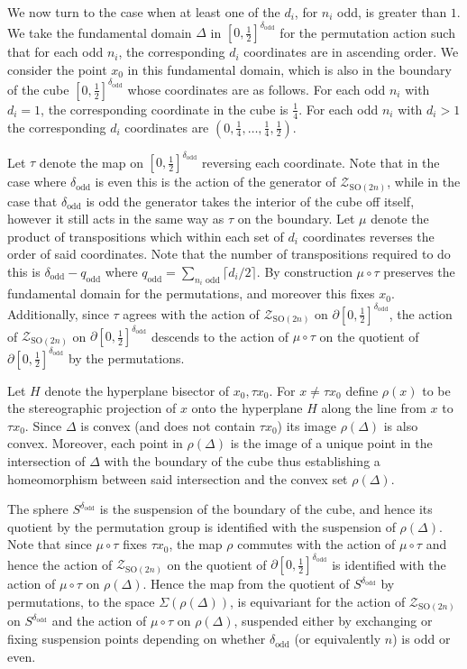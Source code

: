 \documentclass[11pt,a4paper]{article}
\def\SO{\mathrm{SO}}
\def\cZ{\mathcal{Z}}
\def\cZ{{\mathcal Z}}
\def\odd{\mathrm{odd}}
\def\ZDSO{\cZ_{\SO(2n)}}
\begin{document}
\bigskip

We now turn to the case when at least one of the $d_i$, for $n_i$ odd, is greater than $1$. We take the fundamental domain $\Delta$ in $[0,\frac 12]^{\delta_\odd}$ for the permutation action such that for each odd $n_i$, the corresponding $d_i$ coordinates are in ascending order. We consider the point $x_0$ in this fundamental domain, which is also in the boundary of the cube $[0,\frac 12]^{\delta_\odd}$ whose coordinates are as follows.  For each odd $n_i$ with $d_i=1$, the corresponding coordinate in the cube is $\frac 14$. For each odd $n_i$ with $d_i>1$ the corresponding $d_i$ coordinates are $(0,\frac 14,\dots,\frac 14,\frac 12)$.

Let $\tau$ denote the map on $[0, \frac 12]^{\delta_\odd}$ reversing each coordinate.  Note that in the case where ${\delta_\odd}$ is even this is the action of the generator of $\ZDSO$, while in the case that ${\delta_\odd}$ is odd the generator takes the interior of the cube off itself, however it still acts in the same way as $\tau$ on the boundary. Let $\mu$ denote the product of transpositions which within each set of $d_i$ coordinates reverses the order of said coordinates. Note that the number of transpositions required to do this is $\delta_\odd-q_\odd$ where $q_\odd=\sum\limits_{n_i \text{ odd}} \lceil d_i/2\rceil$. By construction $\mu\circ\tau$ preserves the fundamental domain for the permutations, and moreover this fixes $x_0$.  Additionally, since $\tau$ agrees with the action of $\ZDSO$ on $\partial [0, \frac 12]^{\delta_\odd}$, the action of $\ZDSO$ on $\partial [0, \frac 12]^{\delta_\odd}$ descends to the action of $\mu\circ\tau$ on the quotient of $\partial [0, \frac 12]^{\delta_\odd}$ by the permutations.

Let $H$ denote the hyperplane bisector of $x_0,\tau x_0$. For $x\neq \tau x_0$ define $\rho(x)$ to be the stereographic projection of $x$ onto the hyperplane $H$ along the line from $x$ to  $\tau x_0$. Since $\Delta$ is convex (and does not contain $\tau x_0$) its image $\rho(\Delta)$ is also convex.  Moreover, each point in  $\rho(\Delta)$ is the image of a unique point in the intersection of $\Delta$ with the boundary of the cube thus establishing a homeomorphism between said intersection and the convex set $\rho(\Delta)$.

The sphere $S^{\delta_\odd}$ is the suspension of the boundary of the cube, and hence its quotient by the permutation group is identified with the suspension of $\rho(\Delta)$. Note that since $\mu\circ \tau$ fixes $\tau x_0$, the map $\rho$ commutes with the action of $\mu\circ\tau$ and hence the action of $\ZDSO$ on the quotient of $\partial [0, \frac 12]^{\delta_\odd}$ is identified with the action of $\mu\circ \tau$ on $\rho(\Delta)$. Hence the map from the quotient of $S^{\delta_\odd}$ by permutations, to the space  $\Sigma(\rho(\Delta))$, is equivariant for the action of $\ZDSO$ on $S^{\delta_\odd}$ and the action of $\mu\circ \tau$ on 
$\rho(\Delta)$, suspended either by exchanging or fixing suspension points depending on whether ${\delta_\odd}$ (or equivalently $n$) is odd or even.
\end{document}
